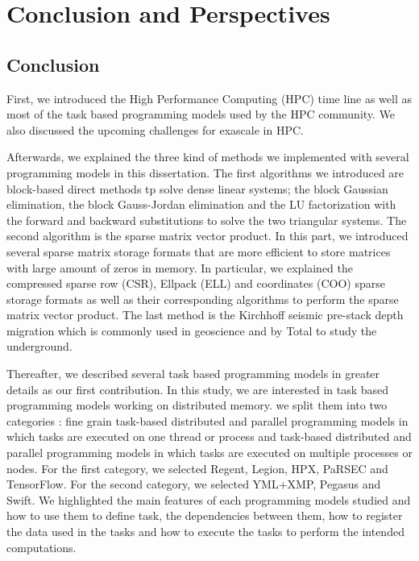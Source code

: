 \chapter{Conclusion and Perspectives \label{chap:ccl}}
\section{Conclusion}

First, we introduced the High Performance Computing (HPC) time line as well as most of the task based programming models used by the HPC community.
We also discussed the upcoming challenges for exascale in HPC.

Afterwards, we explained the three kind of methods we implemented with several programming models in this dissertation.
The first algorithms we introduced are block-based direct methods tp solve dense linear systems; the block Gaussian elimination, the block Gauss-Jordan elimination and the LU factorization with the forward and backward substitutions to solve the two triangular systems.
The second algorithm is the sparse matrix vector product.
In this part, we introduced several sparse matrix storage formats that are more efficient to store matrices with large amount of zeros in memory.
In particular, we explained the compressed sparse row (CSR), Ellpack (ELL) and coordinates (COO) sparse storage formats as well as their corresponding algorithms to perform the sparse matrix vector product.
The last method is the Kirchhoff seismic pre-stack depth migration which is commonly used in geoscience and by Total to study the underground.

Thereafter, we described several task based programming models in greater details as our first contribution.
In this study, we are interested in task based programming models working on distributed memory.
we split them into two categories : fine grain task-based distributed and parallel programming models in which tasks are executed on one thread or process and task-based distributed and parallel programming models in which tasks are executed on multiple processes or nodes.
For the first category, we selected Regent, Legion, HPX, PaRSEC and TensorFlow.
For the second category, we selected YML+XMP, Pegasus and Swift.
We highlighted the main features of each programming models studied and how to use them to define task, the dependencies between them, how to register the data used in the tasks and how to execute the tasks to perform the intended computations.

